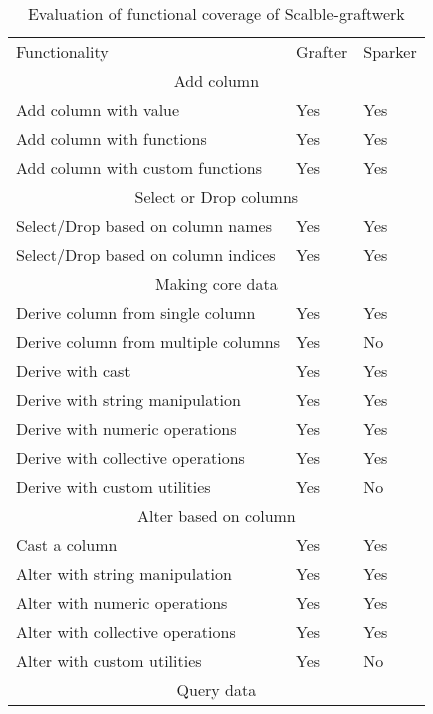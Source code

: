 \begin{table}[]
\centering
\caption{Evaluation of functional coverage of Scalble-graftwerk}
\label{tab:cont}
\begin{tabular}{lll}
Functionality                           & Grafter & Sparker \\
\multicolumn{3}{c}{{\color[rgb]{0.210,0.175,0.47} Add column}} \\
Add column with value                   & Yes     & Yes     \\
Add column with functions               & Yes     & Yes     \\
Add column with custom functions        & Yes     & Yes     \\             
\multicolumn{3}{c}{{\color[rgb]{0.210,0.175,0.47} Select or Drop columns}} \\
Select/Drop based on column names       & Yes     & Yes     \\
Select/Drop based on column indices     & Yes     & Yes     \\
\multicolumn{3}{c}{{\color[rgb]{0.210,0.175,0.47} Making core data}} \\
Derive column from single column        & Yes     & Yes     \\
Derive column from multiple columns     & Yes     & No      \\
Derive with cast                        & Yes     & Yes     \\
Derive with string manipulation         & Yes     & Yes     \\
Derive with numeric operations          & Yes     & Yes     \\
Derive with collective operations       & Yes     & Yes     \\
Derive with custom utilities            & Yes     & No      \\
\multicolumn{3}{c}{{\color[rgb]{0.210,0.175,0.47} Alter based on column}} \\
Cast a column                           & Yes     & Yes     \\
Alter with string manipulation          & Yes     & Yes     \\
Alter with numeric operations           & Yes     & Yes     \\
Alter with collective operations        & Yes     & Yes     \\
Alter with custom utilities             & Yes     & No      \\
\multicolumn{3}{c}{{\color[rgb]{0.210,0.175,0.47} Query data}} \\

\end{tabular}
\end{table}

